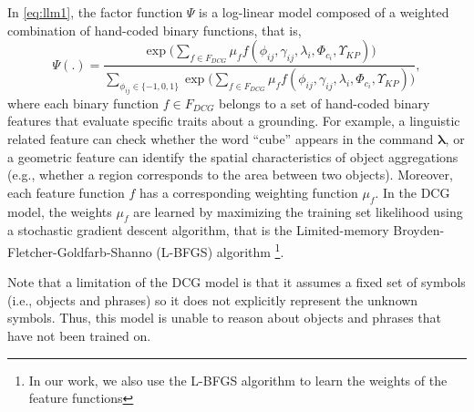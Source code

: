 In \eqref{eq:llm1}, the factor function $\Psi$ is a log-linear model composed of a weighted combination of hand-coded binary functions, that is,
\begin{equation}
\Psi(.) = \frac {\exp \Big( \sum\limits_{f \in F_{DCG}} \mu_f f(\phi_{ij},\gamma_{ij},\lambda_i,\Phi_{c_{i}},\Upsilon_{KP}) \Big)}{\sum\limits_{\phi_{ij} \in \{-1,0,1\}}\exp \Big( \sum\limits_{f \in F_{DCG}} \mu_f f(\phi_{ij},\gamma_{ij},\lambda_i,\Phi_{c_{i}},\Upsilon_{KP}) \Big)},
\label{eq:llm2}
\end{equation}
where each binary function $f \in F_{DCG}$ belongs to a set of hand-coded binary features that evaluate specific traits about a grounding. For example, a linguistic related feature can check whether the word ``cube'' appears in the command $\boldsymbol{\lambda}$, or a geometric feature can identify the spatial characteristics of object aggregations (e.g., whether a region corresponds to the area between two objects). Moreover, each feature function $f$ has a corresponding weighting function $\mu_f$. In the DCG model, the weights $\mu_f$ are learned by maximizing the training set likelihood using a stochastic gradient descent algorithm, that is the Limited-memory Broyden-Fletcher-Goldfarb-Shanno (L-BFGS) algorithm \footnote{In our work, we also use the L-BFGS algorithm to learn the weights of the feature functions}. 


Note that a limitation of the DCG model is that it assumes a fixed set of symbols (i.e., objects and phrases) so it does not explicitly represent the unknown symbols. Thus, this model is unable to reason about objects and phrases that have not been trained on. 